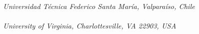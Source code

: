 \begin{titlepage}
\begin{center}
        \\
       \vspace*{0.2cm}
       \noindent \emph{Universidad T\'ecnica Federico Santa Mar\'ia, Valpara\'iso, Chile} \\
       \vspace*{0.7cm}
        \\
       \vspace*{0.2cm}
       \noindent \emph{University of Virginia, Charlottesville, VA 22903, USA} \\
       \vspace*{0.7cm}
     \end{center}
\renewcommand*{\thefootnote}{\arabic{footnote}}

\date{\today}
     

\end{titlepage}
\sloppy

\titlepage
